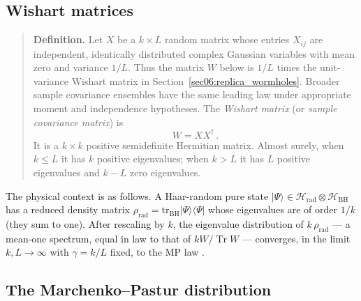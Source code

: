 \documentclass[11pt,letterpaper]{article}
\theoremstyle{plain}
\theoremstyle{definition}
\theoremstyle{remark}
\begin{document}
\subsection{Wishart matrices}

\begin{quote}
\textbf{Definition.}
Let $X$ be a $k \times L$ random matrix whose entries $X_{ij}$ are independent,
identically distributed complex Gaussian variables with mean zero and
variance $1/L$. Thus the matrix $W$ below is $1/L$ times the unit-variance
Wishart matrix in Section~\ref{sec06:replica_wormholes}. Broader sample covariance ensembles have the same leading
law under appropriate moment and independence hypotheses.  The \emph{Wishart matrix} (or \emph{sample covariance matrix}) is
\begin{equation}
  W = X X^{\dagger}\,.
  \label{eq16:wishart_def}
\end{equation}
It is a $k \times k$ positive semidefinite Hermitian matrix.  Almost surely, when $k \le L$
it has $k$ positive eigenvalues; when $k > L$ it has $L$ positive
eigenvalues and $k - L$ zero eigenvalues.
\end{quote}

The physical context is as follows.  A Haar-random pure state
$|\Psi\rangle \in \mathcal{H}_{\mathrm{rad}} \otimes \mathcal{H}_{\mathrm{BH}}$
has a reduced density matrix
$\rho_{\mathrm{rad}} = \mathrm{tr}_{\mathrm{BH}} |\Psi\rangle\langle\Psi|$
whose eigenvalues are of order $1/k$ (they sum to one).  After rescaling by
$k$, the eigenvalue distribution of $k\,\rho_{\mathrm{rad}}$ --- a mean-one spectrum, equal in law to that of
$kW/\operatorname{Tr}W$ --- converges, in the limit
$k, L \to \infty$ with $\gamma = k/L$ fixed, to the MP law
\cite{page1993, marchenkopastur1967}.

\subsection{The Marchenko--Pastur distribution}
\end{document}
